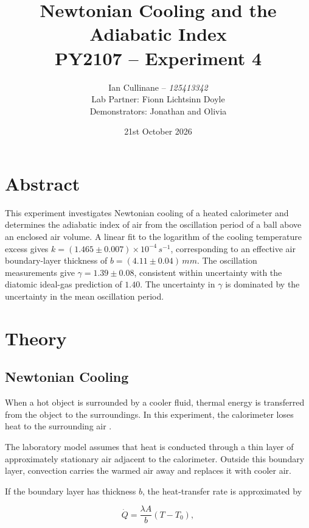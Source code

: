 \documentclass[12pt,a4paper]{article}
\title{
    \Large\textbf{Newtonian Cooling and the Adiabatic Index}\\[0.5em]
    \large PY2107 -- Experiment 4
}
\author{
    Ian Cullinane -- \textit{125413342}\\[0.5em]
    Lab Partner: Fionn Lichtsinn Doyle\\[0.5em]
    Demonstrators: Jonathan and Olivia
}
\date{21st October 2026}
\begin{document}
\maketitle
\thispagestyle{empty}

\newpage
\tableofcontents
\newpage

\section{Abstract}

This experiment investigates Newtonian cooling of a heated
calorimeter and determines the adiabatic index of air from the
oscillation period of a ball above an enclosed air volume. A linear
fit to the logarithm of the cooling temperature excess gives
$k=(1.465\pm0.007)\times10^{-4}\,\si{s^{-1}}$, corresponding to an
effective air boundary-layer thickness of
$b=(4.11\pm0.04)\,\si{mm}$. The oscillation measurements give
$\gamma=1.39\pm0.08$, consistent within uncertainty with the
diatomic ideal-gas prediction of $1.40$. The uncertainty in
$\gamma$ is dominated by the uncertainty in the mean oscillation
period.

\section{Theory}

\subsection{Newtonian Cooling}

When a hot object is surrounded by a cooler fluid, thermal energy
is transferred from the object to the surroundings. In this
experiment, the calorimeter loses heat to the surrounding air
\cite{py2107,incropera2018}.

The laboratory model assumes that heat is conducted through a thin
layer of approximately stationary air adjacent to the calorimeter.
Outside this boundary layer, convection carries the warmed air away
and replaces it with cooler air.

If the boundary layer has thickness $b$, the heat-transfer rate is
approximated by

\begin{equation}
    \dot{Q} =
    \frac{\lambda A}{b}(T-T_0),
    \label{eq:heatflow}
\end{equation}
\end{document}
